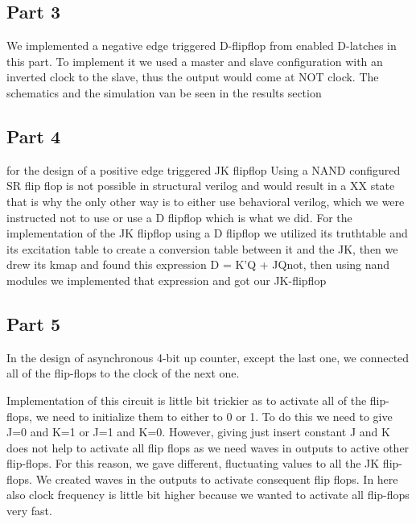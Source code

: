 \documentclass[pdftex,12pt,a4paper]{article}
\begin{document}
\subsection{Part 3}
We implemented a negative edge triggered D-flipflop from enabled D-latches in this part. To implement it we used a master and slave configuration with an inverted clock to the slave, thus the output would come at NOT clock. The schematics and the simulation van be seen in the results section
\subsection{Part 4}
for the design of a positive edge triggered JK flipflop Using a NAND configured SR flip flop is not possible in structural verilog and would result in a XX state that is why the only other way is to either use behavioral verilog, which we were instructed not to use or use a D flipflop which is what we did. For the implementation of the JK flipflop using a D flipflop we utilized its truthtable and its excitation table to create a conversion table between it and the JK, then we drew its kmap and found this expression D = K'Q + JQnot, then using nand modules we implemented that expression and got our JK-flipflop

\subsection{Part 5}

In the design of asynchronous 4-bit up counter, except the last one, we connected all of the flip-flops to the clock of the next one.


Implementation of this circuit is little bit trickier as to activate all of the flip-flops, we need to initialize them to either to 0 or 1. To do this we need to give J=0 and K=1 or J=1 and K=0. However, giving just insert constant J and K does not help to activate all flip flops as we need waves in outputs to active other flip-flops. For this reason, we gave different, fluctuating values to all the JK flip-flops. We created waves in the outputs to activate consequent flip flops. In here also clock frequency is little bit higher because we wanted to activate all flip-flops very fast.
\end{document}
